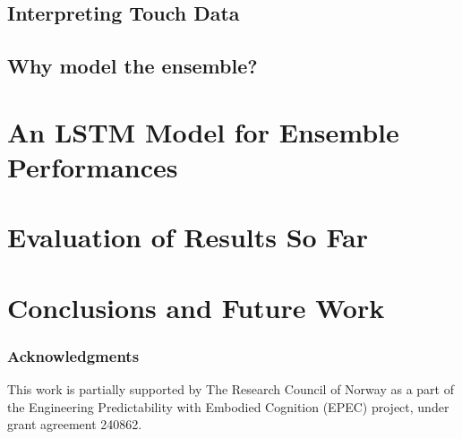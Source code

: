 \documentclass{article}
\begin{document}
\subsection{Interpreting Touch Data}



\subsection{Why model the ensemble?}




\section{An LSTM Model for Ensemble Performances}



\section{Evaluation of Results So Far}

\section{Conclusions and Future Work}





\subsubsection*{Acknowledgments}
This work is partially supported by The Research Council of Norway as
a part of the Engineering Predictability with Embodied Cognition
(EPEC) project, under grant agreement 240862.





\end{document}
